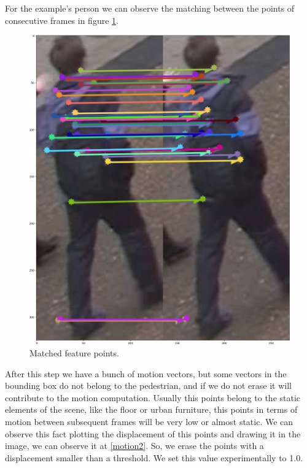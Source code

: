 For the example's person we can observe the matching between the points of consecutive frames in figure \ref{solution4}.

\begin{figure}[hptb]
\centering         
\includegraphics[width=0.3\linewidth]{implementation/matching.png}
\caption{Matched feature points.} \label{solution4}
\end{figure}





After this step we have a bunch of motion vectors, but some vectors in the bounding box do not belong to the pedestrian, and if we do not erase it will contribute to the motion computation. Usually this points belong to the static elements of the scene, like the floor or urban furniture, this points in terms of motion between subsequent frames will be very low or almost static. We can observe this fact plotting the displacement of this points and drawing it in the image, we can observe it at \ref{motion2}. So, we erase the points with a displacement smaller than a threshold. We set this value experimentally to 1.0. 

